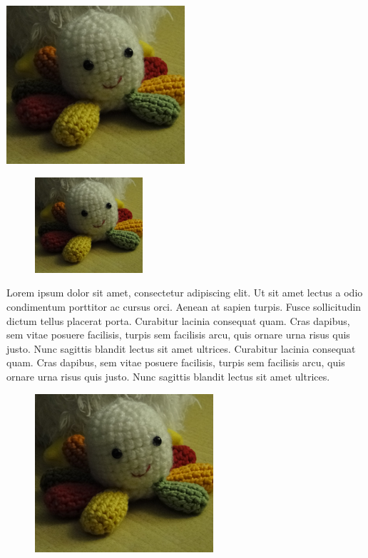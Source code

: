 \documentclass{article}
\begin{document}
\includegraphics[angle=45]{poulpy.png} %




\begin{figure}
\includegraphics[width=4cm]{poulpy.png}
\end{figure}
Lorem ipsum dolor sit amet, consectetur adipiscing elit. Ut sit amet lectus a odio condimentum porttitor ac cursus orci. Aenean at sapien turpis. Fusce sollicitudin dictum tellus placerat porta. Curabitur lacinia consequat quam. Cras dapibus, sem vitae posuere facilisis, turpis sem facilisis arcu, quis ornare urna risus quis justo. Nunc sagittis blandit lectus sit amet ultrices.
Curabitur lacinia consequat quam. Cras dapibus, sem vitae posuere facilisis, turpis sem facilisis arcu, quis ornare urna risus quis justo. Nunc sagittis blandit lectus sit amet ultrices. 


\begin{figure}
\begin{center}
\includegraphics{poulpy.png} 
\end{center}

\end{figure}
\end{document}

